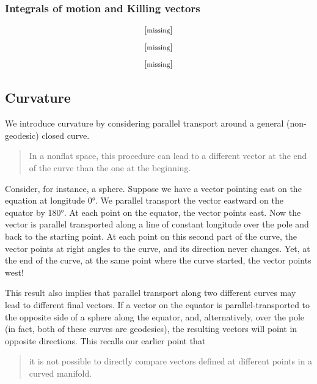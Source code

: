 \subsubsection{Integrals of motion and Killing vectors}
%
\begin{equation}
  \eqtxt{missing}
\end{equation}
%
\begin{equation}
  \eqtxt{missing}
\end{equation}
%
\begin{equation}
  \eqtxt{missing}
\end{equation}


\subsection{Curvature}
%
 We introduce curvature by considering parallel transport around a general (non-geodesic) closed curve.
%
\begin{quotation}
  In a nonflat space, this procedure can lead to a different vector at the end of the curve than the one at the beginning.
\end{quotation}
%
Consider, for instance, a sphere. Suppose we have a vector pointing east on the equation at longitude \ang{0}. We parallel transport the vector eastward on the equator by \ang{180}. At each point on the equator, the vector points east. Now the vector is parallel transported along a line of constant longitude over the pole and back to the starting point. At each point on this second part of the curve, the vector points at right angles to the curve, and its direction never changes. Yet, at the end of the curve, at the same point where the curve started, the vector points west!

This result also implies that parallel transport along two different curves may lead to different final vectors. If a vector on the equator is parallel-transported to the opposite side of a sphere along the equator, and, alternatively, over the pole (in fact, both of these curves are geodesics), the resulting vectors will point in opposite directions. This recalls our earlier point that 
%
\begin{quotation}
  it is not possible to directly compare vectors defined at different points in a curved manifold.
\end{quotation}

